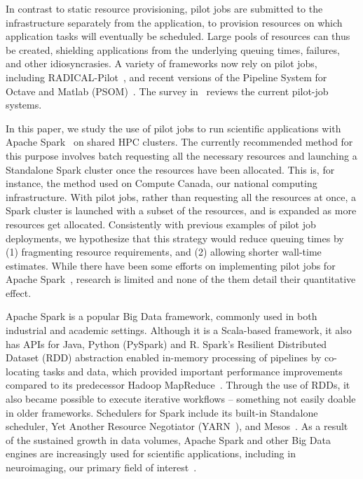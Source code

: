 \documentclass{IEEEtran}
\begin{document}
In contrast to static resource provisioning, pilot jobs are submitted to
the infrastructure separately from the application, to provision resources
on which application tasks will eventually be scheduled. Large pools of
resources can thus be created, shielding applications from the underlying
queuing times, failures, and other idiosyncrasies. A variety of frameworks
now rely on pilot jobs, including RADICAL-Pilot~\cite{merzky2015radical},
and recent versions of the Pipeline System for Octave and Matlab
(PSOM)~\cite{bellec2012pipeline}. The survey in~\cite{turilli2018comprehensive} reviews
the current pilot-job systems.

In this paper, we study the use of pilot jobs to run scientific
applications with Apache Spark~\cite{zaharia2016apache} on shared HPC
clusters. The currently recommended method for this purpose involves batch
requesting all the
necessary resources and launching a Standalone Spark cluster once the
resources have been allocated. This is, for instance, the method used on
Compute Canada,
 our national computing infrastructure. With pilot
jobs, rather than requesting all the resources at once, a Spark cluster is
launched with a subset of the resources, and is expanded as more resources
get allocated. Consistently with previous examples of pilot job
deployments, we hypothesize that this strategy would reduce queuing times
by (1) fragmenting resource requirements, and (2) allowing shorter wall-time
estimates. While there have been some efforts on implementing pilot jobs
for Apache Spark~\cite{luckow2016hadoop}, research is limited and
none of the them detail their quantitative effect.

Apache Spark is a popular Big Data framework, commonly used in both
industrial and academic settings. Although it is a Scala-based framework,
it also has APIs for Java, Python (PySpark) and R. Spark's Resilient
Distributed Dataset (RDD) abstraction enabled in-memory processing of
pipelines by co-locating tasks and data, which provided important
performance improvements compared to its predecessor Hadoop
MapReduce~\cite{dean2008mapreduce}. Through the use of RDDs, it also became possible
to execute iterative workflows -- something not easily doable in older
frameworks. Schedulers for Spark include its built-in Standalone scheduler,
Yet Another Resource Negotiator (YARN~\cite{apache13yet}), and Mesos~\cite{hindman2011mesos}. As a
result of the sustained growth in data volumes, Apache Spark and other
Big Data engines are increasingly used for scientific applications,
including in neuroimaging, our primary field of
interest~\cite{boubela2016big,mehta2017comparative,freeman2014mapping}.
\end{document}
